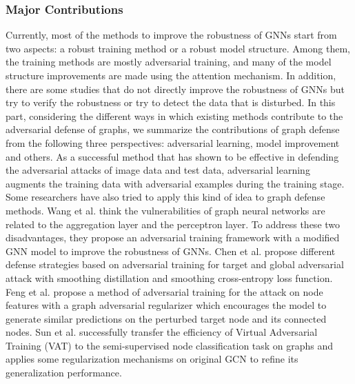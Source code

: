 \subsubsection{Major Contributions}
Currently, most of the methods to improve the robustness of GNNs start from two aspects: a robust training method or a robust model structure. Among them, the training methods are mostly adversarial training, and many of the model structure improvements are made using the attention mechanism. In addition, there are some studies that do not directly improve the robustness of GNNs but try to verify the robustness or try to detect the data that is disturbed. In this part, considering the different ways in which existing methods contribute to the adversarial defense of graphs, we summarize the contributions of graph defense from the following three perspectives: adversarial learning, model improvement and others.
As a successful method that has shown to be effective in defending the adversarial attacks of image data and test data, adversarial learning \cite{goodfellow2014explaining} augments the training data with adversarial examples during the training stage. Some researchers have also tried to apply this kind of idea to graph defense methods. Wang et al.
\cite{wang2019adversarial} think the vulnerabilities of graph neural networks are related to the aggregation layer and the perceptron layer. To address these two disadvantages, they propose an adversarial training framework with a modified GNN model to improve the robustness of GNNs.
Chen et al. \cite{chen2019can} propose different defense strategies based on adversarial training for target and global adversarial attack with smoothing distillation and smoothing cross-entropy loss function.
Feng et al. \cite{feng2019graph} propose a method of adversarial training for the attack on node features with a graph adversarial regularizer which encourages the model to generate similar predictions on the perturbed target node and its connected nodes.
Sun et al. \cite{sun2019virtual} successfully transfer the efficiency of Virtual Adversarial Training (VAT) to the semi-supervised node classification task on graphs and applies some regularization mechanisms on original GCN to refine its generalization performance.

